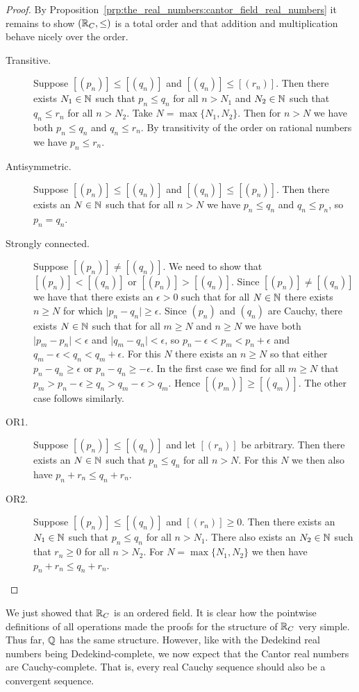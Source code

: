 \documentclass[../main.tex]{subfiles}
\begin{document}
\begin{proof}
    By Proposition~\ref{prp:the_real_numbers:cantor_field_real_numbers} it remains to show $(\mathbb{R}_C,\leq)$ is a total order and that addition and multiplication behave nicely over the order.
    \begin{description}
        \item[Transitive.] Suppose $[(p_n)]\leq[(q_n)]$ and $[(q_n)]\leq[(r_n)]$. Then there exists $N_1\in\mathbb{N}$ such that $p_n\leq q_n$ for all $n>N_1$ and $N_2\in\mathbb{N}$ such that $q_n\leq r_n$ for all $n>N_2$. Take $N=\max\{N_1,N_2\}$. Then for $n>N$ we have both $p_n\leq q_n$ and $q_n\leq r_n$. By transitivity of the order on rational numbers we have $p_n\leq r_n$.
        \item[Antisymmetric.] Suppose $[(p_n)]\leq[(q_n)]$ and $[(q_n)]\leq[(p_n)]$. Then there exists an $N\in\mathbb{N}$ such that for all $n>N$ we have $p_n\leq q_n$ and $q_n\leq p_n$, so $p_n=q_n$.
        \item[Strongly connected.] Suppose $[(p_n)]\neq[(q_n)]$. We need to show that $[(p_n)]<[(q_n)]$ or $[(p_n)]>[(q_n)]$. Since $[(p_n)]\neq[(q_n)]$ we have that there exists an $\epsilon>0$ such that for all $N\in\mathbb{N}$ there exists $n\geq N$ for which $\vert p_n-q_n\vert\geq\epsilon$. Since $(p_n)$ and $(q_n)$ are Cauchy, there exists $N\in\mathbb{N}$ such that for all $m\geq N$ and $n\geq N$ we have both $\vert p_m-p_n\vert<\epsilon$ and $\vert q_m-q_n\vert<\epsilon$, so $p_n-\epsilon<p_m<p_n+\epsilon$ and $q_m-\epsilon<q_n<q_m+\epsilon$. For this $N$ there exists an $n\geq N$ so that either $p_n-q_n\geq\epsilon$ or $p_n-q_n\geq-\epsilon$. In the first case we find for all $m\geq N$ that $p_m>p_n-\epsilon\geq q_n>q_m-\epsilon>q_m$. Hence $[(p_m)]\geq[(q_m)]$. The other case follows similarly.
        \item[OR1.] Suppose $[(p_n)]\leq[(q_n)]$ and let $[(r_n)]$ be arbitrary. Then there exists an $N\in\mathbb{N}$ such that $p_n\leq q_n$ for all $n>N$. For this $N$ we then also have $p_n+r_n\leq q_n+r_n$.
        \item[OR2.] Suppose $[(p_n)]\leq[(q_n)]$ and $[(r_n)]\geq0$. Then there exists an $N_1\in\mathbb{N}$ such that $p_n\leq q_n$ for all $n>N_1$. There also exists an $N_2\in\mathbb{N}$ such that $r_n\geq0$ for all $n>N_2$. For $N=\max\{N_1,N_2\}$ we then have $p_n+r_n\leq q_n+r_n$.
    \end{description}
\end{proof}
We just showed that $\mathbb{R}_C$ is an ordered field. It is clear how the pointwise definitions of all operations made the proofs for the structure of $\mathbb{R}_C$ very simple. Thus far, $\mathbb{Q}$ has the same structure. However, like with the Dedekind real numbers being Dedekind-complete, we now expect that the Cantor real numbers are Cauchy-complete. That is, every real Cauchy sequence should also be a convergent sequence. 
\end{document}
